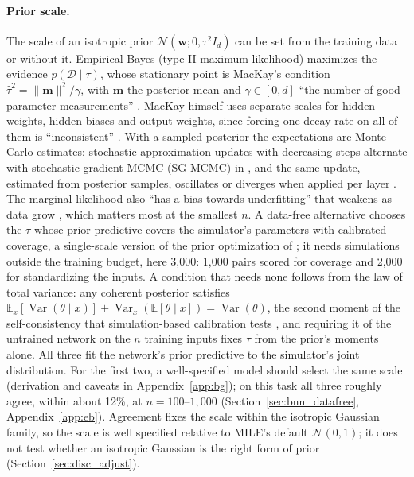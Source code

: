 \documentclass[11pt]{article}
\begin{document}
\paragraph{Prior scale.}
\label{sec:bg_eb}
The scale of an isotropic prior $\mathcal N(\mathbf w;0,\tau^2I_d)$ can be set from the training data or without it.
Empirical Bayes (type-II maximum likelihood) maximizes the evidence $p(\mathcal D\mid\tau)$, whose stationary point is
MacKay's condition $\hat\tau^2=\lVert\mathbf m\rVert^2/\gamma$, with $\mathbf m$ the posterior mean and $\gamma\in[0,d]$
``the number of good parameter measurements'' \citep{mackay1992practical,mackay1992thesis}. MacKay himself uses separate
scales for hidden weights, hidden biases and output weights, since forcing one decay rate on all of them is
``inconsistent'' \citep{mackay1992thesis}. With a sampled posterior the expectations are Monte Carlo estimates:
stochastic-approximation updates with decreasing steps alternate with stochastic-gradient MCMC (SG-MCMC) in \citet{deng2019adaptive}, and the same
update, estimated from posterior samples, oscillates or diverges when applied per layer \citep{antoran2023sampling}. The
marginal likelihood also ``has a bias towards underfitting'' that weakens as data grow \citep{lotfi2022bayesian}, which
matters most at the smallest $n$. A data-free alternative chooses the $\tau$ whose prior predictive covers the
simulator's parameters with calibrated coverage, a single-scale version of the prior optimization of
\citet{delaunoy2024lowbudget}; it needs simulations outside the training budget, here 3{,}000: 1{,}000 pairs scored for coverage and 2{,}000 for
standardizing the inputs. A condition that needs
none follows from the law of total variance: any coherent posterior satisfies
$\mathbb E_x[\operatorname{Var}(\theta\mid x)]+\operatorname{Var}_x(\mathbb E[\theta\mid x])=\operatorname{Var}(\theta)$,
the second moment of the self-consistency that simulation-based calibration tests \citep{talts2018sbc}, and requiring
it of the untrained network on the $n$ training inputs fixes $\tau$ from the prior's moments alone. All three fit the
network's prior predictive to the simulator's joint distribution. For the first two, a well-specified model should
select the same scale (derivation and caveats in Appendix~\ref{app:bg}); on this task all three roughly agree,
within about 12\%, at $n=100$--$1{,}000$ (Section~\ref{sec:bnn_datafree}, Appendix~\ref{app:eb}). Agreement fixes the
scale within the isotropic Gaussian family, so the scale is well specified relative to MILE's default
$\mathcal N(0,1)$; it does not test whether an isotropic Gaussian is the right form of prior
(Section~\ref{sec:disc_adjust}).
\end{document}
